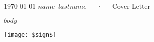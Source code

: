 \documentclass[14pt, a4paper]{awesome-cv}
\begin{document}
\makecvheader[R]

\makecvfooter
  {\today}
  {$name$~$lastname$~~~·~~~Cover Letter}
  {}

\makelettertitle



$body$



\texttt{[image: \$sign\$]}
\end{document}
